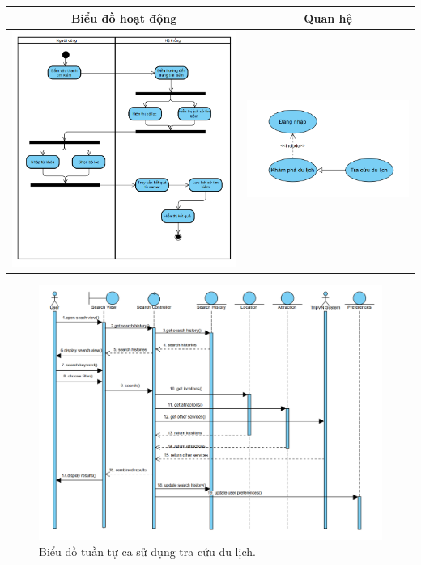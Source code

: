 \noindent 
\begin{tabular}{| c | c |}
    \hline
    \textbf{Biểu đồ hoạt động} & \textbf{Quan hệ} \\ 
    \hline
    \includegraphics[width=0.5\linewidth]{figures/c3/3-3-5-ad.png} 
    & 
    \includegraphics[width=0.45\linewidth]{figures/c3/3-3-5-rd.png} \\ 
    \hline
\end{tabular}



\begin{figure}[H]
    \centering  
    \includegraphics[width=1\textwidth]{figures/c3/3-3-5-sd.png}
    \caption{Biểu đồ tuần tự ca sử dụng tra cứu du lịch.}
    \label{fig:3-3-5-sequence-diagram}
\end{figure}